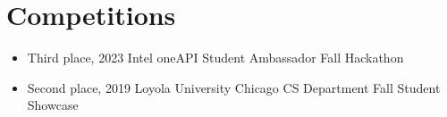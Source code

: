 \section*{Competitions}

\begin{itemize}

\item
Third place,
2023 Intel oneAPI Student Ambassador Fall Hackathon

\item
Second place,
2019 Loyola University Chicago CS Department Fall Student Showcase

\end{itemize}